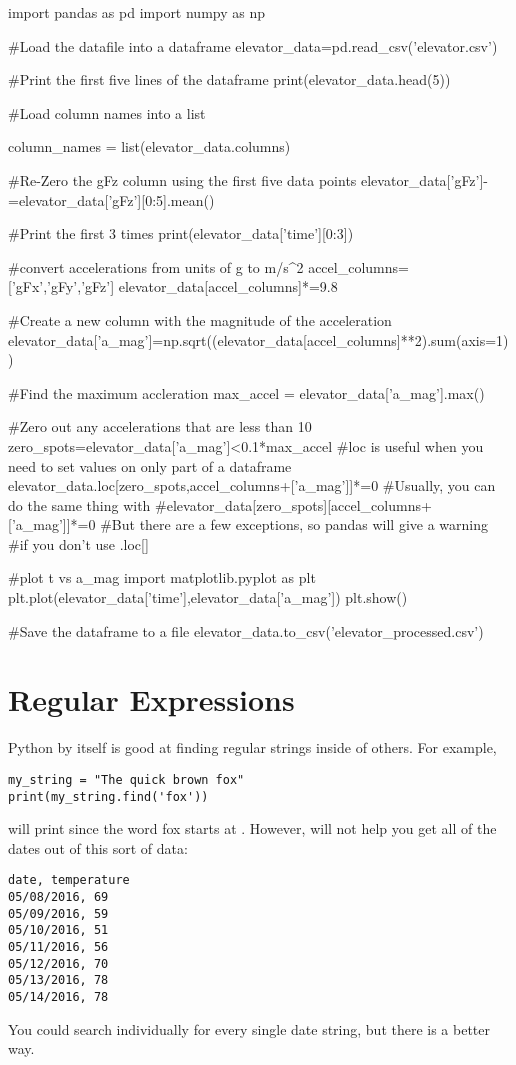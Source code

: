 \begin{codeexample}
\begin{VerbatimOut}{\listingFile}
import pandas as pd
import numpy as np


#Load the datafile into a dataframe
elevator_data=pd.read_csv('elevator.csv')

#Print the first five lines of the dataframe
print(elevator_data.head(5))

#Load column names into a list

column_names = list(elevator_data.columns)

#Re-Zero the gFz column using the first five data points
elevator_data['gFz']-=elevator_data['gFz'][0:5].mean()

#Print the first 3 times
print(elevator_data['time'][0:3])

#convert accelerations from units of g to m/s^2
accel_columns=['gFx','gFy','gFz']
elevator_data[accel_columns]*=9.8

#Create a new column with the magnitude of the acceleration
elevator_data['a_mag']=np.sqrt((elevator_data[accel_columns]**2).sum(axis=1))

#Find the maximum accleration
max_accel = elevator_data['a_mag'].max()

#Zero out any accelerations that are less than 10%
zero_spots=elevator_data['a_mag']<0.1*max_accel
#loc is useful when you need to set values on only part of a dataframe
elevator_data.loc[zero_spots,accel_columns+['a_mag']]*=0
#Usually, you can do the same thing with
#elevator_data[zero_spots][accel_columns+['a_mag']]*=0
#But there are a few exceptions, so pandas will give a warning
#if you don't use .loc[]

#plot t vs a_mag
import matplotlib.pyplot as plt
plt.plot(elevator_data['time'],elevator_data['a_mag'])
plt.show()

#Save the dataframe to a file
elevator_data.to_csv('elevator_processed.csv')

\end{VerbatimOut}
\end{codeexample}
\section{Regular Expressions}
Python by itself is good at finding regular strings inside of others.  For example,
\begin{Verbatim}
my_string = "The quick brown fox"
print(my_string.find('fox'))
\end{Verbatim}
will print  since the word fox starts at . However,  will not help you get all of the dates out of this sort of data:
\begin{Verbatim}
date, temperature
05/08/2016, 69
05/09/2016, 59
05/10/2016, 51
05/11/2016, 56
05/12/2016, 70
05/13/2016, 78
05/14/2016, 78
\end{Verbatim}
You could search individually for every single date string, but there is a better way.

